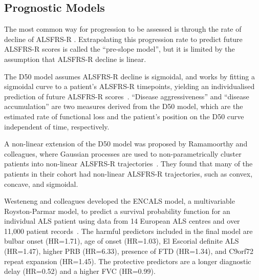 \subsection{Prognostic Models}
The most common way for progression to be assessed is through the rate of decline of ALSFRS-R .
Extrapolating this progression rate to predict future ALSFRS-R scores is called the ``pre-slope model'', but it is limited by the assumption that ALSFRS-R decline is linear.

The D50 model assumes ALSFRS-R decline is sigmoidal, and works by fitting a sigmoidal curve to a patient's ALSFRS-R timepoints, yielding an individualised prediction of future ALSFRS-R scores~\cite{poesenNeurofilamentMarkersALS2017, steinbachApplyingD50Disease2020}.
``Disease aggressiveness'' and ``disease accumulation'' are two measures derived from the D50 model, which are the estimated rate of functional loss and the patient's position on the D50 curve independent of time, respectively.

A non-linear extension of the D50 model was proposed by Ramamoorthy and colleagues, where Gaussian processes are used to non-parametrically cluster patients into non-linear ALSFRS-R trajectories~\cite{ramamoorthyIdentifyingPatternsAmyotrophic2022}.
They found that many of the patients in their cohort had non-linear ALSFRS-R trajectories, such as convex, concave, and sigmoidal.

Westeneng and colleagues developed the ENCALS model, a multivariable Royston-Parmar model, to predict a survival probability function for an individual ALS patient using data from 14 European ALS centres and over 11,000 patient records~\cite{westenengPrognosisPatientsAmyotrophic2018}.
The harmful predictors included in the final model are bulbar onset (HR=1.71), age of onset (HR=1.03), El Escorial definite ALS (HR=1.47), higher PRB (HR=6.33), presence of FTD (HR=1.34), and C9orf72 repeat expansion (HR=1.45).
The protective predictors are a longer diagnostic delay (HR=0.52) and a higher FVC (HR=0.99).

